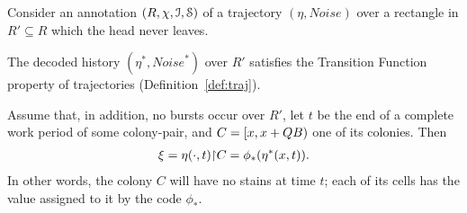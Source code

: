 \documentclass[11pt]{memoir}
\theoremstyle{definition} %
\def\B{B}
\newcommand{\Noise}{\mathit{Noise}}
\newcommand{\Q}{Q} %
\newcommand{\Rg}{R} %
\begin{document}
\begin{lemma}\label{lem:transition}
  Consider an annotation \( (\Rg,\chi, \cI,\cS) \) of a trajectory \( (\eta,\Noise) \)
  over a rectangle in \( \Rg'\subseteq\Rg \)
  which the head never leaves.
  \begin{alphenum}
    \item The decoded history \( (\eta^{*},\Noise^{*}) \) over \( \Rg' \)
      satisfies the Transition Function property of trajectories (Definition~\ref{def:traj}).
    \item\label{i:transition.no-burst} Assume that, in addition, no bursts occur over \( \Rg' \),
      let \( t \) be the end of a complete work period of some colony-pair, and
      \( C=\lint{x}{x+\Q\B} \) one of its colonies.
      Then 
\begin{align*}
 \xi=\eta(\cdot,t)\mathord{\upharpoonright} C =\phi_{*}(\eta^{*}(x,t)) .
\end{align*}
      In other words, the colony \( C  \) will have no stains at time \( t \); each of its cells has
      the value assigned to it by the code \( \phi_{*} \).
  \end{alphenum}
\end{lemma}
\end{document}
